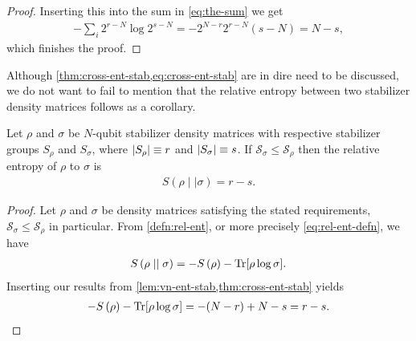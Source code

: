\begin{proof}
   Inserting this into the sum in \cref{eq:the-sum} we get
   \begin{align}
      -\sum_i 2^{r-N} \log 2^{s-N} =
      -2^{N-r}2^{r-N}\left(s-N\right)= N-s
   ,\end{align}
   which finishes the proof.
\end{proof}

Although \cref{thm:cross-ent-stab,eq:cross-ent-stab} are in dire need to be
discussed, we do not want to fail to mention that the relative entropy between
two stabilizer density matrices follows as a corollary.

\begin{cor}\label{col:rel-ent-stab}
  Let $\rho$ and $\sigma$ be $N$-qubit stabilizer density matrices with
  respective stabilizer groups $S_\rho$ and $S_\sigma$, where $\abs{S_\rho}
  \equiv r$ and $\abs{S_\sigma} \equiv s$. If $\mathcal{S}_\sigma \leq
  \mathcal{S}_\rho$ then the relative entropy of $\rho$ to
  $\sigma$ is
  \begin{align}
    S\left(\rho\mid\mid\sigma\right) = r - s
  .\end{align}
\end{cor}

\begin{proof}
  Let $\rho$ and $\sigma$ be density matrices satisfying the stated
  requirements, $\mathcal{S}_\sigma \leq \mathcal{S}_\rho$ in particular. From \cref{defn:rel-ent},
  or more precisely \cref{eq:rel-ent-defn}, we have
  \begin{align}
    S\left( \rho\mid\mid\sigma \right) = -S\left( \rho \right)
    -\Tr[\rho\log\sigma]
  .\end{align}
  Inserting our results from \cref{lem:vn-ent-stab,thm:cross-ent-stab} yields
  \begin{align}
    -S\left( \rho \right) -\Tr[\rho\log\sigma] = -(N-r) + N - s = r - s
  .\end{align}
\end{proof}

